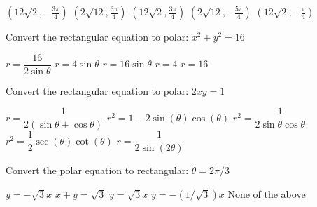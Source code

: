 \documentclass[11pt]{exam}
\begin{document}
\begin{questions}
\begin{minipage}{\linewidth}
\begin{choices}
	\CorrectChoice $\left(12 \sqrt{2},-\frac{3 \pi }{4}\right)$
	\choice $\left(2 \sqrt{12},\frac{3 \pi }{4}\right)$
	\choice $\left(12 \sqrt{2},\frac{3 \pi }{4}\right)$
	\choice $\left(2 \sqrt{12},-\frac{5 \pi }{4}\right)$
	\choice $\left(12 \sqrt{2},-\frac{\pi }{4}\right)$
\end{choices} \answerline

\end{minipage}

\begin{minipage}{\linewidth}



\question Convert the rectangular equation to polar: $x^2 + y^2 = 16$

\begin{choices}
	\choice $r = \dfrac{16}{2\sin\theta}$
	\choice $r = 4 \sin \theta$
	\choice $r = 16 \sin \theta$
	\CorrectChoice $r = 4$
	\choice $r=16$
\end{choices} \answerline
\end{minipage}

\begin{minipage}{\linewidth}



\question Convert the rectangular equation to polar: $2xy=1$

\begin{choices}
	\choice $r = \dfrac{1}{2(\sin\theta + \cos\theta)}$
	\choice $r^2 = 1 - 2\sin(\theta)\cos(\theta)$
	\CorrectChoice $r^2 = \dfrac{1}{2\sin\theta\cos\theta}$
	\choice $r^2 = \dfrac{1}{2}\sec(\theta)\cot(\theta)$
	\choice $r = \dfrac{1}{2\sin(2\theta)}$
\end{choices} \answerline
\end{minipage}

\begin{minipage}{\linewidth}


\question Convert the polar equation to rectangular: $\theta = 2\pi/3$

\begin{choices}
	\correctchoice $y = -\sqrt3 x$
	\choice $x+y = \sqrt3$
	\choice $y = \sqrt3 x$
	\choice $y = -(1/\sqrt3) x$
	\choice None of the above
\end{choices} \answerline


\end{minipage}

\begin{minipage}{\linewidth}



\end{minipage}
\end{questions}
\end{document}
